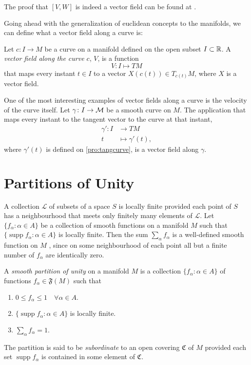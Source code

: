 The proof that $[V,W]$ is indeed a vector field can be found at \cite[p. 24]{docarmo79}.

Going ahead with the generalization of euclidean concepts to the manifolds, we can define what a vector field along a curve is:

\begin{definition}
	Let $c \colon I \to M$ be a curve on a manifold defined on the open subset $I \subset \mathbb{R}$. A \emph{vector field along the curve $c$}, $V$, is a function
	\[
	V \colon I \mapsto TM
	\]
	that maps every instant $t \in I$ to a vector $X(c(t)) \in T_{c(t)} M$, where $X$ is a vector field.
\end{definition}

\begin{example}
	One of the most interesting examples of vector fields along a curve is the velocity of the curve itself. Let $\gamma \colon I \to {\mathcal M}$ be a smooth curve on $M$. The application that maps every instant to the tangent vector to the curve at that instant,
	\begin{align*}
		\gamma' \colon I &\to TM \\
		t &\mapsto \gamma'(t),
	\end{align*}
	where $\gamma'(t)$ is defined on \autoref{pro:tangcurve}, is a vector field along $\gamma$.
\end{example}

\section{Partitions of Unity}
\label{sec:partitionunity}

A collection $\mathcal{L}$ of subsets of a space $S$ is locally finite provided each point of $S$ has a neighbourhood that meets only finitely many elements of $\mathcal{L}$. Let $\{f_\alpha \colon \alpha \in A\}$ be a collection of smooth functions on a manifold $M$ such that $\{\operatorname{supp} f_\alpha \colon \alpha \in A\}$ is locally finite. Then the sum $\sum_\alpha f_\alpha$ is a well-defined smooth function on $M$ , since on some neighbourhood of each point all but a finite number of $f_\alpha$ are identically zero.

\begin{definition}
	A \emph{smooth partition of unity} on a manifold $M$ is a collection $\{f_\alpha \colon \alpha \in A\}$ of functions $f_\alpha \in \mathfrak{F}(M)$ such that
	\begin{enumerate}
		\item $0 \leq f_\alpha \leq 1 \quad \forall \alpha \in A$.
		\item $\{\operatorname{supp} f_\alpha \colon \alpha \in A\}$ is locally finite.
		\item $\sum_\alpha f_\alpha = 1$.
	\end{enumerate}

	The partition is said to be \emph{subordinate} to an open covering $\mathfrak{C}$ of $M$ provided each set $\operatorname{supp} f_\alpha$ is contained in some element of $\mathfrak{C}$.
\end{definition}

